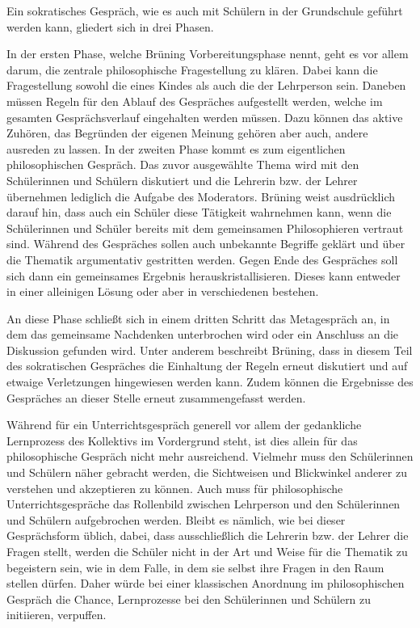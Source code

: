 Ein sokratisches Gespräch, wie es auch mit Schülern in der Grundschule geführt werden kann, gliedert sich in drei Phasen. 

In der ersten Phase, welche Brüning Vorbereitungsphase nennt, geht es vor allem darum, die zentrale philosophische Fragestellung zu klären. 
Dabei kann die Fragestellung sowohl die eines Kindes als auch die der Lehrperson sein. 
Daneben müssen Regeln für den Ablauf des Gespräches aufgestellt werden, welche im gesamten Gesprächsverlauf eingehalten werden müssen. 
Dazu können das aktive Zuhören, das Begründen der eigenen Meinung gehören aber auch, andere ausreden zu lassen\cite[S.\,31]{BB10}.
In der zweiten Phase kommt es zum eigentlichen philosophischen Gespräch. 
Das zuvor ausgewählte Thema wird mit den Schülerinnen und Schülern diskutiert und die Lehrerin bzw. der Lehrer übernehmen lediglich die Aufgabe des Moderators. 
Brüning weist ausdrücklich darauf hin, dass auch ein Schüler diese Tätigkeit wahrnehmen kann, wenn die Schülerinnen und Schüler bereits mit dem gemeinsamen Philosophieren vertraut sind. 
Während des Gespräches sollen auch unbekannte Begriffe geklärt und über die Thematik argumentativ gestritten werden. 
Gegen Ende des Gespräches soll sich dann ein gemeinsames Ergebnis herauskristallisieren. 
Dieses kann entweder in einer alleinigen Lösung oder aber in verschiedenen bestehen. 

An diese Phase schließt sich in einem dritten Schritt das Metagespräch an, in  dem das gemeinsame Nachdenken unterbrochen wird oder ein Anschluss an die Diskussion gefunden wird. 
Unter anderem beschreibt Brüning, dass in diesem Teil des sokratischen Gespräches die Einhaltung der Regeln erneut diskutiert und auf etwaige Verletzungen hingewiesen werden kann. 
Zudem können die Ergebnisse des Gespräches an dieser Stelle erneut zusammengefasst werden.

Während für ein Unterrichtsgespräch generell vor allem der gedankliche Lernprozess des Kollektivs im Vordergrund steht, ist dies allein für das philosophische Gespräch nicht mehr ausreichend. 
Vielmehr muss den Schülerinnen und Schülern näher gebracht werden, die Sichtweisen und Blickwinkel anderer zu verstehen und akzeptieren zu können\cite[S.\,234]{HDB15}. 
Auch muss für philosophische Unterrichtsgespräche das Rollenbild zwischen Lehrperson und den Schülerinnen und Schülern aufgebrochen werden. 
Bleibt es nämlich, wie bei dieser Gesprächsform üblich, dabei, dass ausschließlich die Lehrerin bzw. der Lehrer die Fragen stellt, werden die Schüler nicht in der Art und Weise für die Thematik zu begeistern sein, wie in dem Falle, in dem sie selbst ihre Fragen in den Raum stellen dürfen. 
Daher würde bei einer klassischen Anordnung im philosophischen Gespräch die Chance, Lernprozesse bei den Schülerinnen und Schülern zu initiieren, verpuffen.

